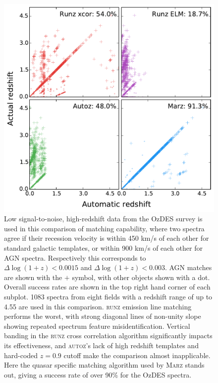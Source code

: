 \documentclass[iop]{emulateapj}
\newcommand{\runz}{\textsc{runz}}
\newcommand{\autoz}{\textsc{autoz}}
\newcommand{\marz}{\textsc{Marz}}
\begin{document}
\begin{figure}[t]
\centering
\includegraphics[width=\columnwidth]{run009Comp.pdf}
\caption{Low signal-to-noise, high-redshift data from the OzDES survey is used in this comparison of matching capability, where two spectra agree if their recession velocity is within 450 km/s of each other for standard galactic templates, or within 900 km/s of each other for AGN spectra. Respectively this corresponds to $\Delta \log(1+z) < 0.0015$ and $\Delta \log(1+z) < 0.003$. AGN matches are shown with the $+$ symbol, with other objects shown with a dot. Overall success rates are shown in the top right hand corner of each subplot. 1083 spectra from eight fields with a redshift range of up to 4.55 are used in this comparison. \runz{} emission line matching performs the worst, with strong diagonal lines of non-unity slope showing repeated spectrum feature misidentification. Vertical banding in the \runz{} cross correlation algorithm significantly impacts its effectiveness, and \autoz{}'s lack of high redshift templates and hard-coded $z=0.9$ cutoff make the comparison almost inapplicable. Here the quasar specific matching algorithm used by \marz{} stands out, giving a success rate of over 90\% for the OzDES spectra.}
\label{fig:low}
\end{figure}
\end{document}
